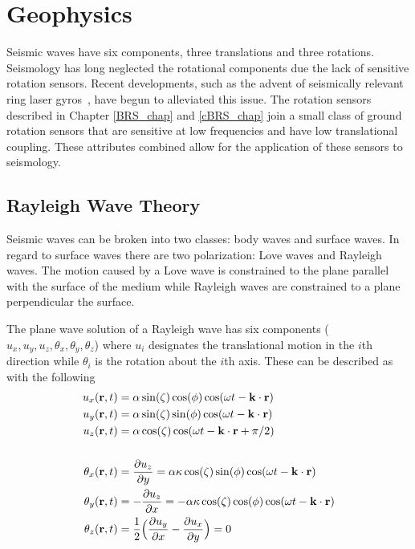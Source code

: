 \documentclass [12pt, proquest]{uwthesis}[2019]
\begin{document}
\section{Geophysics}
Seismic waves have six components, three translations and three rotations. Seismology has long neglected the rotational components due the lack of sensitive rotation sensors. Recent developments, such as the advent of seismically relevant ring laser gyros~\cite{ring}, have begun to alleviated this issue. The rotation sensors described in Chapter \ref{BRS_chap} and \ref{cBRS_chap} join a small class of ground rotation sensors that are sensitive at low frequencies and have low translational coupling. These attributes combined allow for the application of these sensors to seismology.
\subsection{Rayleigh Wave Theory}

Seismic waves can be broken into two classes: body waves and surface waves. In regard to surface waves there are two polarization: Love waves and Rayleigh waves. The motion caused by a Love wave is constrained to the plane parallel with the surface of the medium while Rayleigh waves are constrained to a plane perpendicular the surface. 

The plane wave solution of a Rayleigh wave has six components ($u_x, u_y, u_z, \theta_x, \theta_y, \theta_z$) where $u_i$ designates the translational motion in the $i$th direction while $\theta_i$ is the rotation about the $i$th axis.
These can be described as with the following~\cite{seismic}
\begin{align}
u_x({\bf r} ,t)&=\alpha \sin(\zeta) \cos(\phi) \cos(\omega t-{\bf k}\cdot{\bf r})\label{XEq}\\
u_y({\bf r} ,t)&=\alpha \sin(\zeta) \sin(\phi) \cos(\omega t-{\bf k}\cdot{\bf r})\\
u_z({\bf r} ,t)&=\alpha \cos(\zeta) \cos(\omega t-{\bf k}\cdot{\bf r}+\pi/2)\label{ZEq}\\
\notag \\
\theta_x({\bf r} ,t)&=\frac{\partial u_z}{\partial y}=\alpha \kappa \cos(\zeta) \sin(\phi) \cos(\omega t-{\bf k}\cdot{\bf r})\label{TiltXEq}\\
\theta_y({\bf r} ,t)&=-\frac{\partial u_z}{\partial x}=-\alpha \kappa \cos(\zeta) \cos(\phi) \cos(\omega t-{\bf k}\cdot{\bf r})\\
\theta_z({\bf r} ,t)&=\frac{1}{2}\Big(\frac{\partial u_y}{\partial x}-\frac{\partial u_x}{\partial y}\Big)=0
\end{align}
\end{document}
